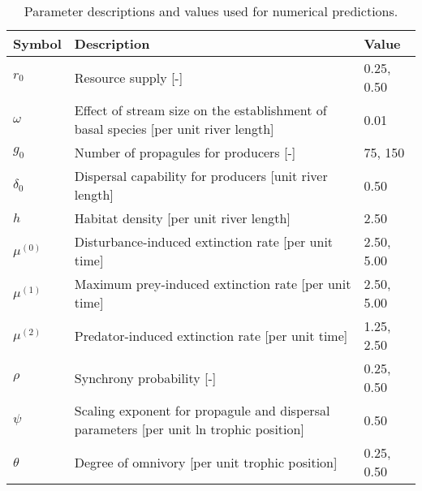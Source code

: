 \begin{table}[ht]
\centering
\caption{Parameter descriptions and values used for numerical predictions.} 
\label{tab:parms-num}
\begingroup\small
\begin{tabularx}{\textwidth}{lll}
  \hline
Symbol & Description & Value \\ 
  \hline
$r_0$ & Resource supply [-] & 0.25, 0.50 \\ 
  $\omega$ & Effect of stream size on the establishment of basal species [per unit river length] & 0.01 \\ 
  $g_0$ & Number of propagules for producers [-] & 75, 150 \\ 
  $\delta_0$ & Dispersal capability for producers [unit river length] & 0.50 \\ 
  $h$ & Habitat density [per unit river length] & 2.50 \\ 
  $\mu^{(0)}$ & Disturbance-induced extinction rate [per unit time] & 2.50, 5.00 \\ 
  $\mu^{(1)}$ & Maximum prey-induced extinction rate [per unit time] & 2.50, 5.00 \\ 
  $\mu^{(2)}$ & Predator-induced extinction rate [per unit time] & 1.25, 2.50 \\ 
  $\rho$ & Synchrony probability [-] & 0.25, 0.50 \\ 
  $\psi$ & Scaling exponent for propagule and dispersal parameters [per unit ln trophic position] & 0.50 \\ 
  $\theta$ & Degree of omnivory [per unit trophic position] & 0.25, 0.50 \\ 
   \hline
\end{tabularx}
\endgroup
\end{table}

